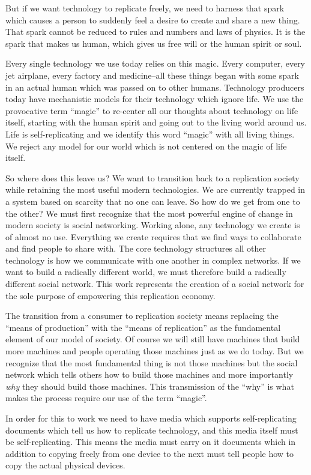 But if we want technology to replicate freely, we need to harness that
spark which causes a person to suddenly feel a desire to create and
share a new thing. That spark cannot be reduced to rules and numbers and
laws of physics. It is the spark that makes us human, which gives us
free will or the human spirit or soul.

Every single technology we use today relies on this magic. Every
computer, every jet airplane, every factory and medicine--all these
things began with some spark in an actual human which was passed on to
other humans. Technology producers today have mechanistic models for
their technology which ignore life. We use the provocative term
``magic'' to re-center all our thoughts about technology on life itself,
starting with the human spirit and going out to the living world around
us. Life is self-replicating and we identify this word ``magic'' with
all living things. We reject any model for our world which is not
centered on the magic of life itself.

So where does this leave us? We want to transition back to a replication
society while retaining the most useful modern technologies. We are
currently trapped in a system based on scarcity that no one can leave.
So how do we get from one to the other? We must first recognize that the
most powerful engine of change in modern society is social networking.
Working alone, any technology we create is of almost no use. Everything
we create requires that we find ways to collaborate and find people to
share with. The core technology structures all other technology is how
we communicate with one another in complex networks. If we want to build
a radically different world, we must therefore build a radically
different social network. This work represents the creation of a social
network for the sole purpose of empowering this replication economy.

The transition from a consumer to replication society means replacing
the ``means of production'' with the ``means of replication'' as the
fundamental element of our model of society. Of course we will still
have machines that build more machines and people operating those
machines just as we do today. But we recognize that the most fundamental
thing is not those machines but the social network which tells others
how to build those machines and more importantly \emph{why} they should
build those machines. This transmission of the ``why'' is what makes the
process require our use of the term ``magic''.

In order for this to work we need to have media which supports
self-replicating documents which tell us how to replicate technology,
and this media itself must be self-replicating. This means the media
must carry on it documents which in addition to copying freely from one
device to the next must tell people how to copy the actual physical
devices.

